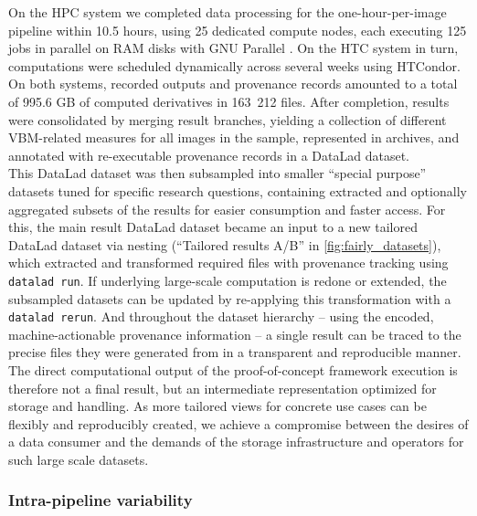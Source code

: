 On the \gls{HPC} system we completed data processing for the one-hour-per-image pipeline within 10.5 hours, using 25 dedicated compute nodes, each executing 125 jobs in parallel on RAM disks with GNU Parallel \citep{tange2011gnu}.
On the \gls{HTC} system in turn, computations were scheduled dynamically across several weeks using HTCondor.
On both systems, recorded outputs and provenance records amounted to a total of 995.6 GB of computed derivatives in 163~212 files.
After completion, results were consolidated by merging result branches, yielding a collection of different VBM-related measures for all images in the sample, represented in archives, and annotated with re-executable provenance records in a DataLad dataset.\\
This DataLad dataset was then subsampled into smaller ``special purpose'' datasets tuned for specific research questions, containing extracted and optionally aggregated subsets of the results for easier consumption and faster access.
For this, the main result DataLad dataset became an input to a new tailored DataLad dataset via nesting (``Tailored results A/B'' in \cref{fig:fairly_datasets}), which extracted and transformed required files with provenance tracking using \texttt{datalad run}.
If underlying large-scale computation is redone or extended, the subsampled datasets can be updated by re-applying this transformation with a \texttt{datalad rerun}.
And throughout the dataset hierarchy -- using the encoded, machine-actionable provenance information -- a single result can be traced to the precise files they were generated from in a transparent and reproducible manner.
The direct computational output of the proof-of-concept framework execution is therefore not a final result, but an intermediate representation optimized for storage and handling.
As more tailored views for concrete use cases can be flexibly and reproducibly created, we achieve a compromise between the desires of a data consumer and the demands of the storage infrastructure and operators for such large scale datasets.

\subsubsection{Intra-pipeline variability}

